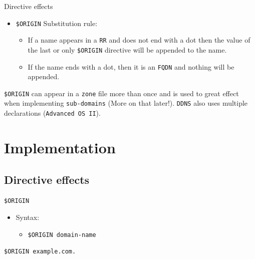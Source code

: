 \documentclass[xcolor=table]{beamer}
\begin{document}
\begin{frame}{Directive effects}
  \begin{itemize}
    \item \texttt{\$ORIGIN} Substitution rule:
      \begin{itemize}
        \item If a name appears in a \texttt{RR} and does not end with a dot then the value of the last or only \texttt{\$ORIGIN} directive will be appended to the name.
        \item If the name ends with a dot, then it is an \texttt{FQDN} and nothing will be appended.
      \end{itemize}
  \end{itemize}
  \begin{tcolorbox}[title={\textbf{NOTE:}}]
    \texttt{\$ORIGIN} can appear in a \texttt{zone} file more than once and is used to great effect when implementing \texttt{sub-domains} (More on that later!). \texttt{DDNS} also uses multiple declarations (\texttt{Advanced OS II}). 
  \end{tcolorbox}
\end{frame}

\section{Implementation}
\subsection{Directive effects}
\begin{frame}{\texttt{\$ORIGIN}}
  \begin{itemize}
    \item Syntax:
      \begin{itemize}
        \item \texttt{\$ORIGIN domain-name}
      \end{itemize}
  \end{itemize}
  \begin{tcolorbox}
    \begin{center}
      \texttt{\$ORIGIN example.com.}      
    \end{center}
  \end{tcolorbox}
\end{frame}
\end{document}
